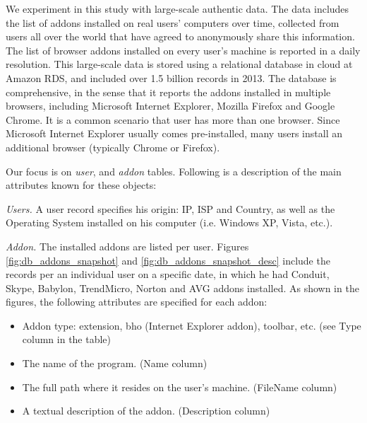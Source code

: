 \documentclass[11pt,oneside]{book}
\let\Oldsection\section
\renewcommand{\section}{\FloatBarrier\Oldsection}
\begin{document}

We experiment in this study with large-scale authentic data.  The data includes the list of addons installed on real users' computers over time, collected from users all over the world that have agreed to anonymously share this information.  The list of browser addons installed on every user's machine is reported in a daily resolution.  This large-scale data is stored using a relational database in cloud at Amazon RDS, and included over 1.5 billion records in 2013. The database is comprehensive, in the sense that it  reports the addons installed in multiple browsers, including Microsoft Internet  Explorer, Mozilla Firefox and Google Chrome. It  is a common scenario that user has more than one browser. Since Microsoft Internet Explorer usually comes pre-installed, many users install an additional browser (typically Chrome or Firefox).

Our focus is on {\it user}, and {\it addon} tables. Following is a description of the main attributes known for these objects:

{\it Users.} A user record specifies his origin: IP, ISP and Country, as well as the Operating System installed on his computer (i.e. Windows XP, Vista, etc.).

{\it Addon.} The installed addons are listed per user. Figures \ref{fig:db_addons_snapshot} and \ref{fig:db_addons_snapshot_desc} include the records per an individual user on a specific date, in which he had Conduit, Skype, Babylon, TrendMicro, Norton and AVG addons installed. As shown in the figures, the following attributes are specified for each addon:
\begin{itemize}
\item Addon type: extension, bho (Internet Explorer addon), toolbar, etc. (see Type column in the table)
\item The name of the program. (Name column)
\item The full path where it resides on the user's machine. (FileName column)
\item A textual description of the addon. (Description column)
\end{itemize}
\end{document}
